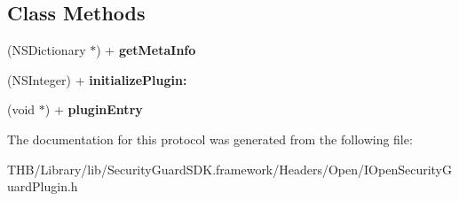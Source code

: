 \subsection*{Class Methods}
\begin{DoxyCompactItemize}
\item 
\mbox{\label{protocol_i_open_security_guard_plugin_01-p_aca5d34bf3b9dce490ad1a0afe6cfe1f7}} 
(N\+S\+Dictionary $\ast$) + {\bfseries get\+Meta\+Info}
\item 
\mbox{\label{protocol_i_open_security_guard_plugin_01-p_af865732e9b0a2151a4d43686cdd0a66d}} 
(N\+S\+Integer) + {\bfseries initialize\+Plugin\+:}
\item 
\mbox{\label{protocol_i_open_security_guard_plugin_01-p_a51ac7b86a5a4ed3aa5f7e4107ce2d1ed}} 
(void $\ast$) + {\bfseries plugin\+Entry}
\end{DoxyCompactItemize}


The documentation for this protocol was generated from the following file\+:\begin{DoxyCompactItemize}
\item 
T\+H\+B/\+Library/lib/\+Security\+Guard\+S\+D\+K.\+framework/\+Headers/\+Open/I\+Open\+Security\+Guard\+Plugin.\+h\end{DoxyCompactItemize}
